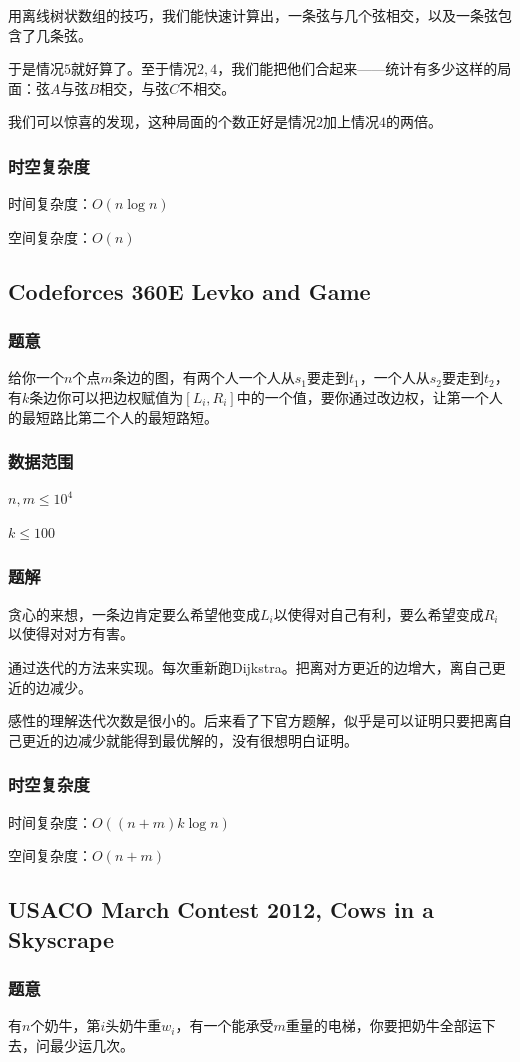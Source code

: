 \documentclass{ctexart}
\begin{document}
用离线树状数组的技巧，我们能快速计算出，一条弦与几个弦相交，以及一条弦包含了几条弦。

于是情况$5$就好算了。至于情况$2,4$，我们能把他们合起来——统计有多少这样的局面：弦$A$与弦$B$相交，与弦$C$不相交。

我们可以惊喜的发现，这种局面的个数正好是情况$2$加上情况$4$的两倍。
\subsubsection{时空复杂度}
时间复杂度：$O(n \log n)$

空间复杂度：$O(n)$
\subsection{Codeforces 360E Levko and Game}
\subsubsection{题意}
给你一个$n$个点$m$条边的图，有两个人一个人从$s_1$要走到$t_1$，一个人从$s_2$要走到$t_2$，有$k$条边你可以把边权赋值为$[L_i,R_i]$中的一个值，要你通过改边权，让第一个人的最短路比第二个人的最短路短。
\subsubsection{数据范围}
$n,m \le 10^4$

$k \le 100$
\subsubsection{题解}
贪心的来想，一条边肯定要么希望他变成$L_i$以使得对自己有利，要么希望变成$R_i$以使得对对方有害。

通过迭代的方法来实现。每次重新跑Dijkstra。把离对方更近的边增大，离自己更近的边减少。

感性的理解迭代次数是很小的。后来看了下官方题解，似乎是可以证明只要把离自己更近的边减少就能得到最优解的，没有很想明白证明。
\subsubsection{时空复杂度}
时间复杂度：$O((n+m)k \log n)$

空间复杂度：$O(n+m)$
\subsection{USACO March Contest 2012, Cows in a Skyscrape}
\subsubsection{题意}
有$n$个奶牛，第$i$头奶牛重$w_i$，有一个能承受$m$重量的电梯，你要把奶牛全部运下去，问最少运几次。
\end{document}
